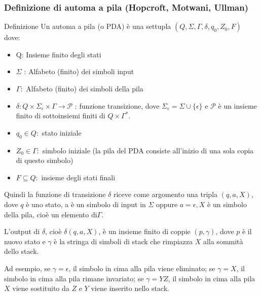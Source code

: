 \subsubsection{Definizione di automa a pila (Hopcroft, Motwani, Ullman)}
Definizione
Un automa a pila (o PDA) è una settupla
$\left(Q, \Sigma, \Gamma, \delta, q_{0}, Z_{0}, F\right)$
dove:
\begin{itemize}
    \item Q: Insieme finito degli stati
    \item $\Sigma$ : Alfabeto (finito) dei simboli input
    \item $\Gamma:$ Alfabeto (finito) dei simboli della pila
    \item $\delta: Q \times \Sigma_{\epsilon} \times \Gamma \rightarrow \mathcal{P}$ : funzione transizione, dove $\Sigma_{\epsilon}=\Sigma \cup\{\epsilon\}$ e $\mathcal{P}$ è un insieme finito di sottoinsiemi finiti di $Q \times \Gamma^{*}$.
    \item  $q_{0} \in Q:$ stato iniziale
    \item $Z_{0} \in \Gamma:$ simbolo iniziale
(la pila del PDA consiste all'inizio di una sola copia di questo simbolo)
    \item $F \subseteq Q:$ insieme degli stati finali
\end{itemize}
Quindi la funzione di transizione $\delta$ riceve come argomento una tripla $(q, a, X)$, dove $q$ è uno stato, a è un simbolo di input in $\Sigma$ oppure $a=\epsilon, X$ è un simbolo della pila, cioè un elemento $\mathrm{di} \Gamma$.

\vspace{5mm}

L'output di $\delta$, cioè $\delta(q, a, X)$, è un insieme finito di coppie $(p, \gamma)$, dove $p$ è il nuovo stato e $\gamma$ è la stringa di simboli di stack che rimpiazza $X$ alla sommità dello stack.

Ad esempio, se $\gamma=\epsilon$, il simbolo in cima alla pila viene eliminato; se $\gamma=X$, il simbolo in cima alla pila rimane invariato; se $\gamma=Y Z$, il simbolo in cima alla pila $X$ viene sostituito da $Z$ e $Y$ viene inserito nello stack.

